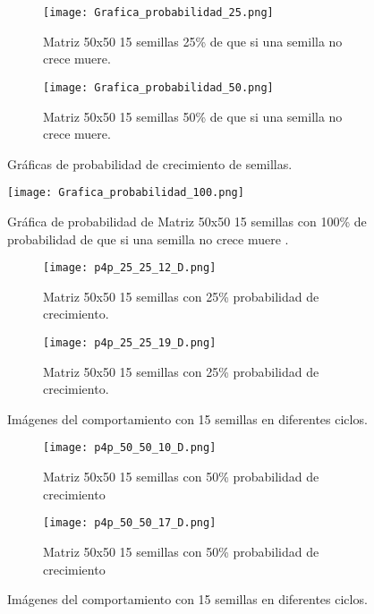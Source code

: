 \documentclass{article}
\begin{document}
\begin{figure}[H]
\centering
\begin{subfigure}[b]{0.45\linewidth}
\texttt{[image: Grafica\_probabilidad\_25.png]}
\caption{Matriz 50x50 15 semillas 25\% de que si una semilla no crece muere.}
\end{subfigure}
\begin{subfigure}[b]{0.45\linewidth}
\texttt{[image: Grafica\_probabilidad\_50.png]}
\caption{Matriz 50x50 15 semillas 50\% de que si una semilla no crece muere.}
\end{subfigure}
\caption{Gráficas de probabilidad de crecimiento de semillas.}
\label{fig:westminster}
\end{figure}

\begin{figure}[H]
\centering
\texttt{[image: Grafica\_probabilidad\_100.png]}
\caption{\label{fig3}Gráfica de probabilidad de Matriz 50x50 15 semillas con 100\% de probabilidad de que si una semilla no crece muere .}
\end{figure}

\begin{figure}[H]
\centering
\begin{subfigure}[b]{0.30\linewidth}
\texttt{[image: p4p\_25\_25\_12\_D.png]}
\caption{Matriz 50x50 15 semillas con 25\% probabilidad de crecimiento.}
\end{subfigure}
\begin{subfigure}[b]{0.30\linewidth}
\texttt{[image: p4p\_25\_25\_19\_D.png]}
\caption{Matriz 50x50 15 semillas con 25\% probabilidad de crecimiento.}
\end{subfigure}
\caption{Imágenes del comportamiento con 15 semillas en diferentes ciclos.}
\label{fig:westminster}
\end{figure}

\begin{figure}[H]
\centering
\begin{subfigure}[b]{0.30\linewidth}
\texttt{[image: p4p\_50\_50\_10\_D.png]}
\caption{Matriz 50x50 15 semillas con 50\% probabilidad de crecimiento}
\end{subfigure}
\begin{subfigure}[b]{0.30\linewidth}
\texttt{[image: p4p\_50\_50\_17\_D.png]}
\caption{Matriz 50x50 15 semillas con 50\% probabilidad de crecimiento}
\end{subfigure}
\caption{Imágenes del comportamiento con 15 semillas en diferentes ciclos.}
\label{fig:westminster}
\end{figure}

\printbibliography
\end{document}
